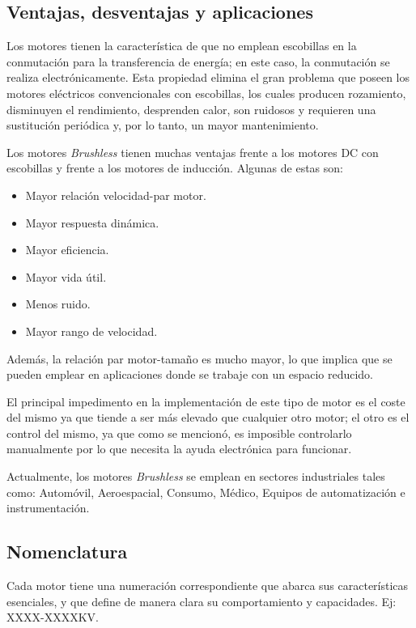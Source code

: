 \documentclass[../main]{subfiles}
\begin{document}
\subsection{Ventajas, desventajas y aplicaciones}
Los motores tienen la caracter\'istica{} de que no emplean escobillas en la conmutaci\'on{} para la transferencia de energ\'ia{}; en este caso, la conmutaci\'on{} se realiza electr\'onicamente{}. Esta propiedad elimina el gran problema que poseen los motores el\'ectricos{} convencionales con escobillas, los cuales producen rozamiento, disminuyen el rendimiento, desprenden calor, son ruidosos y requieren una sustituci\'on{} peri\'odica{} y, por lo tanto, un mayor mantenimiento.

Los motores \emph{Brushless} tienen muchas ventajas frente a los motores DC con escobillas y frente a los motores de inducci\'on{}. Algunas de estas son:
\begin{itemize}
\item Mayor relaci\'on{} velocidad-par motor.
\item Mayor respuesta din\'amica{}.
\item Mayor eficiencia.
\item Mayor vida \'util{}.
\item Menos ruido.
\item Mayor rango de velocidad.
\end{itemize}


Adem\'as{}, la relaci\'on{} par motor-tama\~no{} es mucho mayor, lo que implica que se pueden emplear en aplicaciones donde se trabaje con un espacio reducido.

El principal impedimento en la implementaci\'on{} de este tipo de motor es el coste del mismo ya que tiende a ser m\'as{} elevado que cualquier otro motor; el otro es el control del mismo, ya que como se mencion\'o{}, es imposible controlarlo manualmente por lo que necesita la ayuda electr\'onica{} para funcionar.

Actualmente, los motores \emph{Brushless} se emplean en sectores industriales tales como: Autom\'ovil{}, Aeroespacial, Consumo, M\'edico{}, Equipos de automatizaci\'on{} e instrumentaci\'on{}.

\subsection{Nomenclatura}
Cada motor tiene una numeraci\'on{} correspondiente que abarca sus caracter\'isticas{} esenciales, y que define de manera clara su comportamiento y capacidades. Ej: XXXX-XXXXKV.
\end{document}
